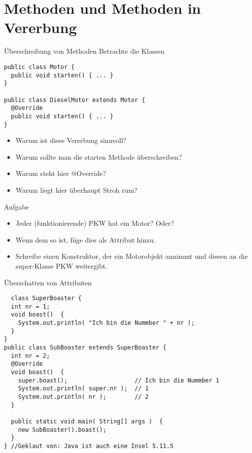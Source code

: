 \documentclass[18pt]{beamer}
\begin{document}
\section{Methoden und Methoden in Vererbung}
\begin{frame}[fragile]{Überschreibung von Methoden}
Betrachte die Klassen
\begin{lstlisting}
public class Motor {
  public void starten() { ... }
}

public class DieselMotor extends Motor {
  @Override
  public void starten() { ... }
} 
\end{lstlisting}
\pause
\begin{itemize}
 \item Warum ist diese Vererbung sinnvoll? \pause
 \item Warum sollte man die starten Methode überschreiben? \pause
 \item Warum steht hier @Override? \pause
 \item Warum liegt hier überhaupt Stroh rum?
\end{itemize}
\end{frame}

\begin{frame}{Aufgabe}
 \begin{itemize}
  \item Jeder (funktionierende) PKW hat ein Motor? Oder?
  \item Wenn dem so ist, füge dies als Attribut hinzu.
  \item Schreibe einen Konstruktor, der ein Motorobjekt annimmt und diesen an die super-Klasse PKW weitergibt.
 \end{itemize}
\end{frame}

\begin{frame}[fragile]{Überschatten von Attributen}
 \begin{lstlisting}
  class SuperBoaster {
  int nr = 1;
  void boast()  {
    System.out.println( "Ich bin die Nummber " + nr );
  }
}
public class SubBoaster extends SuperBoaster {
  int nr = 2;
  @Override 
  void boast()  {
    super.boast();                   // Ich bin die Nummber 1
    System.out.println( super.nr );  // 1
    System.out.println( nr );        // 2
  }

  public static void main( String[] args )  {
    new SubBoaster().boast();
  }
} //Geklaut von: Java ist auch eine Insel 5.11.5
 \end{lstlisting}
\end{frame}
\end{document}
